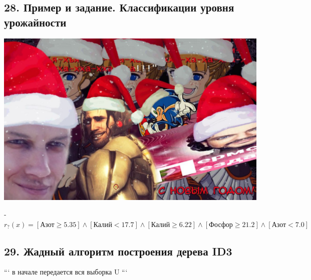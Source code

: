 \subsection{28. Пример и задание. Классификации уровня урожайности}

\includegraphics[scale=0.3]{figures/samplefigure.jpg}

- $r_?(x) = [\text{Азот} \geqslant 5.35] \wedge [\text{Калий} < 17.7] \wedge [\text{Калий} \geqslant 6.22] \wedge [\text{Фосфор} \geqslant 21.2] \wedge [\text{Азот} < 7.0]$

\subsection{29. Жадный алгоритм построения дерева ID3}

```
в начале передается вся выборка U
```

